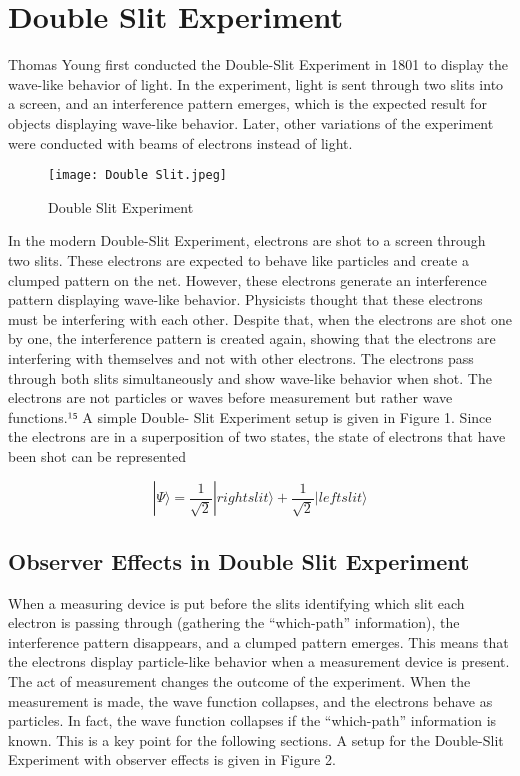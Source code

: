 \documentclass{article}
\begin{document}
\section{Double Slit Experiment}
Thomas Young first conducted the Double-Slit Experiment in 1801 to display the wave-like behavior of light. In
the experiment, light is sent through two slits into a screen,
and an interference pattern emerges, which is the expected
result for objects displaying wave-like behavior. Later, other
variations of the experiment were conducted with beams of
electrons instead of light.

\begin{figure}[h]
\centering
     \texttt{[image: Double Slit.jpeg]}
      \caption{Double Slit Experiment}
       \label{fig:DSE}
\end{figure}

In the modern Double-Slit Experiment, electrons are shot
to a screen through two slits. These electrons are expected
to behave like particles and create a clumped pattern on the
net. However, these electrons generate an interference pattern displaying wave-like behavior. Physicists thought that
these electrons must be interfering with each other. Despite
that, when the electrons are shot one by one, the interference
pattern is created again, showing that the electrons are interfering with themselves and not with other electrons. The
electrons pass through both slits simultaneously and show
wave-like behavior when shot. The electrons are not particles
or waves before measurement but rather wave functions.¹⁵ A
simple Double- Slit Experiment setup is given in Figure 1.
Since the electrons are in a superposition of two states, the
state of electrons that have been shot can be represented


\begin{equation}
    |\Psi\rangle=\frac{1}{\sqrt{2}}|right slit\rangle+ \frac{1}{\sqrt{2}}|left slit\rangle
\end{equation}



\subsection{Observer Effects in Double Slit Experiment}

When a measuring device is put before the slits identifying which slit each electron is passing through (gathering the
“which-path” information), the interference pattern disappears, and a clumped pattern emerges. This means that the
electrons display particle-like behavior when a measurement
device is present. The act of measurement changes the outcome of the experiment.
When the measurement is made, the wave function collapses, and the electrons behave as particles. In fact, the wave
function collapses if the “which-path” information is known.
This is a key point for the following sections. A setup for
the Double-Slit Experiment with observer effects is given in
Figure 2.
\end{document}
